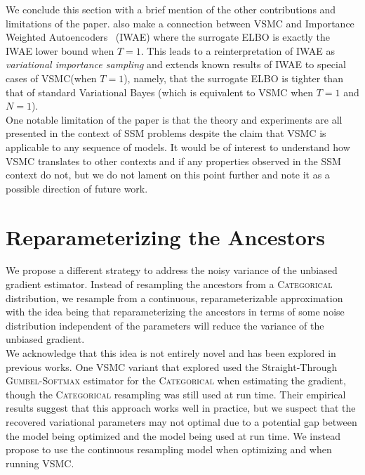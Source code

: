 \documentclass[12pt]{article}
\newcommand{\vsmc}{\textsc{VSMC}\xspace}
\newcommand{\elbo}{\textsc{ELBO}\xspace}
\newcommand{\categorical}{\textsc{Categorical}\xspace}
\newcommand{\gumbelsoftmax}{\textsc{Gumbel-Softmax}\xspace}
\newcommand{\iwae}{\textsc{IWAE}\xspace}
\newcommand{\ssm}{\textsc{SSM}\xspace}
\begin{document}
We conclude this section with a brief mention of the other contributions and limitations of the paper. \textcite{Naesseth:2018} also make a connection between \vsmc and Importance Weighted Autoencoders~\parencite{Burda:2016} (\iwae) where the surrogate \elbo is exactly the \iwae lower bound when $T=1$. This leads to a reinterpretation of \iwae as \textit{variational importance sampling} and extends known results of \iwae to special cases of \vsmc (when $T=1$), namely, that the surrogate \elbo is tighter than that of standard Variational Bayes (which is equivalent to \vsmc when $T=1$ and $N=1$).
\\

One notable limitation of the paper is that the theory and experiments are all presented in the context of \ssm problems despite the claim that \vsmc is applicable to any sequence of models. It would be of interest to understand how \vsmc translates to other contexts and if any properties observed in the \ssm context do not, but we do not lament on this point further and note it as a possible direction of future work.

\section{Reparameterizing the Ancestors}\label{sec:approx}

We propose a different strategy to address the noisy variance of the unbiased gradient estimator. Instead of resampling the ancestors from a \categorical distribution, we resample from a continuous, reparameterizable approximation with the idea being that reparameterizing the ancestors in terms of some noise distribution independent of the parameters will reduce the variance of the unbiased gradient.
\\

We acknowledge that this idea is not entirely novel and has been explored in previous works. One \vsmc variant that \textcite{Lawson:2018} explored used the Straight-Through \gumbelsoftmax estimator \parencite{Jang:2017} for the \categorical when estimating the gradient, though the \categorical resampling was still used at run time. Their empirical results suggest that this approach works well in practice, but we suspect that the recovered variational parameters may not optimal due to a potential gap between the model being optimized and the model being used at run time. We instead propose to use the continuous resampling model when optimizing and when running \vsmc.
\\
\end{document}
